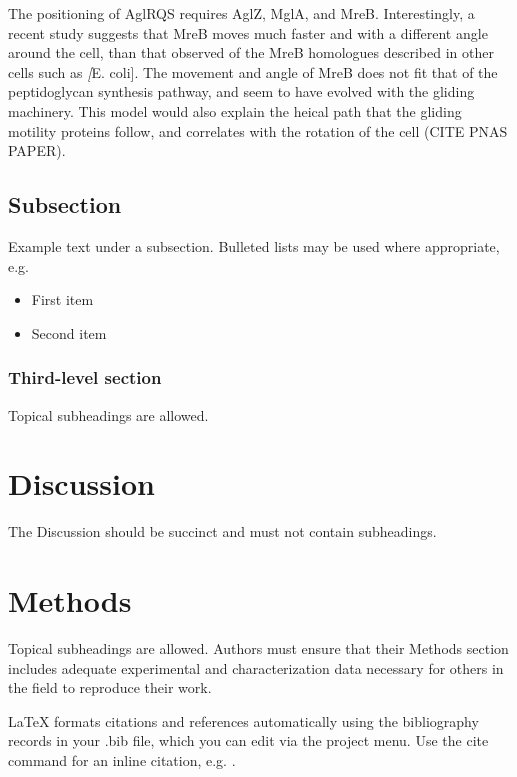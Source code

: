 \documentclass[fleqn,10pt]{wlscirep}
\begin{document}
The positioning of AglRQS requires AglZ, MglA, and MreB. Interestingly, a recent study suggests that MreB moves much faster and with a different angle around the cell, than that observed of the MreB homologues described in other cells such as \textit[E. coli]. The movement and angle of MreB does not fit that of the peptidoglycan synthesis pathway, and seem to have evolved with the gliding machinery. This model would also explain the heical path that the gliding motility proteins follow, and correlates with the rotation of the cell (CITE PNAS PAPER).



\subsection*{Subsection}

Example text under a subsection. Bulleted lists may be used where appropriate, e.g.

\begin{itemize}
\item First item
\item Second item
\end{itemize}

\subsubsection*{Third-level section}
 
Topical subheadings are allowed.

\section*{Discussion}

The Discussion should be succinct and must not contain subheadings.

\section*{Methods}

Topical subheadings are allowed. Authors must ensure that their Methods section includes adequate experimental and characterization data necessary for others in the field to reproduce their work.



\noindent LaTeX formats citations and references automatically using the bibliography records in your .bib file, which you can edit via the project menu. Use the cite command for an inline citation, e.g.  \cite{Hao:gidmaps:2014}.
\end{document}

